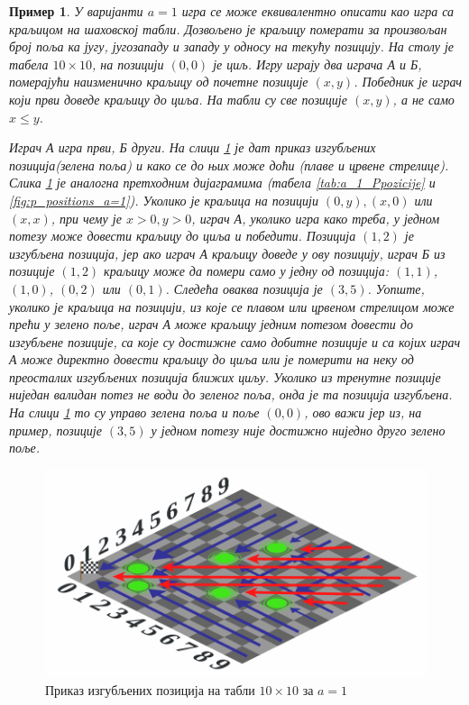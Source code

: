 \documentclass[a4paper]{article}
\newtheorem{example}{Пример}
\begin{document}
\begin{example}
	У варијанти $ a = 1 $ игра се може еквивалентно описати као игра са краљицом на шаховској табли. Дозвољено је краљицу померати за произвољан број поља ка југу, југозападу и западу у односу на текућу позицију. На столу је табела $ 10\times10 $, на позицији $ (0, 0) $ је циљ. Игру играју два играча \textit{А} и \textit{Б}, померајући наизменично краљицу од почетне позиције $ (x,y) $. Победник је играч који први доведе краљицу до циља. На табли су све позиције $ (x, y) $, а не само $ x \leq y $.
	
	Играч \textit{А} игра први, \textit{Б} други. На слици \ref{fig:sahovska_tabla_pozicije_a_1} је дат приказ изгубљених позиција(зелена поља) и како се до њих може доћи (плаве и црвене стрелице). Слика \ref{fig:sahovska_tabla_pozicije_a_1} је аналогна претходним дијаграмима (табела \ref{tab:a_1_Ppozicije} и \ref{fig:p_positions_a=1}). Уколико је краљица на позицији $ (0, y), (x,0) $ или $ (x,x) $, при чему је $ x > 0, y > 0 $, играч \textit{А}, уколико игра како треба, у једном потезу може довести краљицу до циља и победити. Позиција $ (1, 2) $ је изгубљена позиција, јер ако играч \textit{А} краљицу доведе у ову позицију, играч \textit{Б} из позиције $ (1, 2) $ краљицу може да помери само у једну од позиција: $ (1, 1) $, $ (1, 0) $, $ (0, 2) $ или $ (0, 1) $. Следећа оваква позиција је $ (3, 5) $. Уопште, уколико је краљица на позицији, из које се плавом или црвеном стрелицом може прећи у зелено поље, играч \textit{А} може краљицу једним потезом довести до изгубљене позиције, са које су достижне само добитне позиције и са којих играч \textit{А} може директно довести краљицу до циља или је померити на неку од преосталих изгубљених позиција ближих циљу. Уколико из тренутне позиције ниједан валидан потез не води до зеленог поља, онда је та позиција изгубљена. На слици \ref{fig:sahovska_tabla_pozicije_a_1} то су управо зелена поља и поље $ (0, 0) $, ово важи јер из, на пример, позиције $ (3, 5) $ у једном потезу није достижно ниједно друго зелено поље.
\end{example}
 
\begin{figure}[H]
	\begin{center}
		\includegraphics[width=\textwidth]{10x10_a1.png}
	\end{center}
	\caption{Приказ изгубљених позиција на табли $ 10 \times 10 $ за $ a = 1 $}
	\label{fig:sahovska_tabla_pozicije_a_1}
\end{figure}
\end{document}
